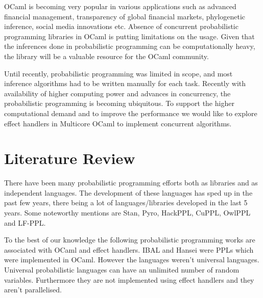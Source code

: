 \documentclass[12pt]{extarticle}
\begin{document}

OCaml is becoming very popular in various applications such as advanced financial management, transparency of global financial markets, phylogenetic inference, social media innovations etc. 
Absence of concurrent probabilistic programming libraries in OCaml is putting limitations on the usage. Given that the inferences done in probabilistic programming can be computationally heavy, the library will be a valuable resource for the OCaml community. 


Until recently, probabilistic programming was limited in scope, and most inference algorithms had to be written manually for each task. 
Recently with availability of higher computing power and advances in concurrency, the probabilistic programming is becoming ubiquitous. 
To support the higher computational demand and to improve the performance we would like to explore effect handlers in Multicore OCaml to implement concurrent algorithms. 
 
 
\section*{Literature Review}

There have been many probabilistic programming efforts both as libraries and as independent languages. 
The development of these languages has sped up in the past few years, there being a lot of languages/libraries developed in the last 5 years. 
Some noteworthy mentions are Stan\cite{stan}, Pyro\cite{pyro}, HackPPL\cite{hack}, CuPPL\cite{collins2020probabilistic}, OwlPPL\cite{roy2020probabilistic} and LF-PPL\cite{zhou2019lfppl}. 

To the best of our knowledge the following probabilistic programming works are associated with OCaml and effect handlers. IBAL \cite{IBAL} and Hansei \cite{Hansei} were PPLs which were implemented in OCaml. 
However the languages weren't universal languages. Universal probabilistic languages can have an unlimited number of random variables. 
Furthermore they are not implemented using effect handlers and they aren't parallelised.
\end{document}
